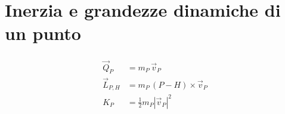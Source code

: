\documentclass[letterpaper,10pt,italian]{jupyterBook}
\begin{document}
\section{Inerzia e grandezze dinamiche di un punto}
\label{\detokenize{ch/mechanics/inertia-point:inerzia-e-grandezze-dinamiche-di-un-punto}}\label{\detokenize{ch/mechanics/inertia-point::doc}}\begin{equation*}
\begin{split}\begin{aligned}
  \vec{Q}_P     & = m_P \, \vec{v}_P \\
  \vec{L}_{P,H} & = m_P \, (P - H) \times \vec{v}_P \\
   K_P          & = \frac{1}{2} m_P \left| \vec{v}_P \right|^2
\end{aligned}\end{split}
\end{equation*}
\sphinxstepscope
\end{document}
